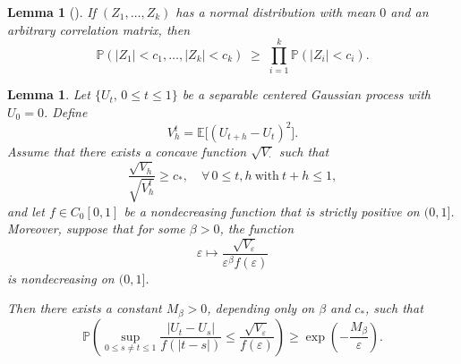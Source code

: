 \documentclass[preprint,12pt]{elsarticle}
\newtheorem{lemma}[theorem]{Lemma}
\theoremstyle{definition}  %
\theoremstyle{plain}  %
\begin{document}
\begin{lemma}[{\cite{Sidak1968}}]
If $(Z_1,\dots,Z_k)$ has a normal distribution with mean $0$ 
and an arbitrary correlation matrix, then 
\begin{equation}\label{Sidak}
    \mathbb{P}\!\left(|Z_1|<c_1, \dots, |Z_k|<c_k\right) 
    \;\geq\; \prod_{i=1}^k \mathbb{P}(|Z_i|<c_i).
\end{equation}  
\end{lemma}



\begin{lemma}\label{smp}
	Let $\{U_t,\,0 \leq t \leq 1\}$ be a separable centered Gaussian process with $U_0 = 0$. Define  
\begin{equation*}
	V_h^t = \mathbb{E}\bigl[(U_{t+h} - U_t)^2\bigr].
\end{equation*}
Assume that there exists a concave function $\sqrt{V_\cdot}$ such that  
\begin{equation*}
	\frac{\sqrt{V_h}}{\sqrt{V_h^t}} \geq c_*, 
	\quad \forall\, 0 \leq t,h \ \text{with}\ t+h \leq 1,
\end{equation*}
and let $f \in C_0[0,1]$ be a nondecreasing function that is strictly positive on $(0,1]$.  
Moreover, suppose that for some $\beta > 0$, the function  
\[
\varepsilon \mapsto \frac{\sqrt{V_\varepsilon}}{\varepsilon^\beta f(\varepsilon)}
\]
is nondecreasing on $(0,1]$.  

Then there exists a constant $M_\beta > 0$, depending only on $\beta$ and $c_*$, such that  
\begin{equation*}
	\mathbb{P}\!\left(
		\sup_{0 \leq s \neq t \leq 1}
		\frac{|U_t - U_s|}{f(|t-s|)}
		\leq \frac{\sqrt{V_\varepsilon}}{f(\varepsilon)} 
	\right) 
	\geq \exp\!\left(-\frac{M_\beta}{\varepsilon}\right).
\end{equation*}
\end{lemma}
\end{document}

